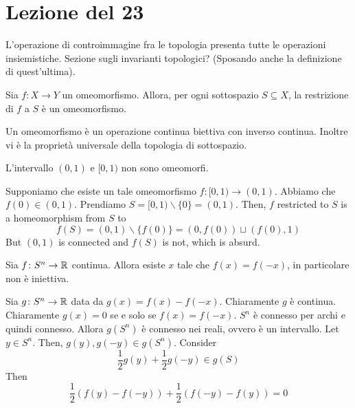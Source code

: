 \documentclass[a4paper]{article}
\begin{document}
\pagebreak

\section{Lezione del 23}

L'operazione di controimmagine fra le topologia presenta tutte le operazioni insiemistiche.
Sezione sugli invarianti topologici? (Sposando anche la definizione di quest'ultima).

\begin{snippetlemma}{}
    Sia \(f \colon X \to Y\) un omeomorfismo.
    Allora, per ogni sottospazio \(S \subseteq X\),
    la restrizione di \(f\) a \(S\) è un omeomorfismo.
\end{snippetlemma}

\begin{snippetproof}{}
    Un omeomorfismo è un operazione continua biettiva con inverso continua.
    Inoltre vi è la proprietà universale della topologia di sottospazio.
\end{snippetproof}

\begin{snippetexample}{}
    L'intervallo \((0,1)\) e \([0,1)\) non sono omeomorfi.
\end{snippetexample}

\begin{snippetproof}{}
    Supponiamo che esiste un tale omeomorfismo \(f \colon [0,1) \to (0,1)\).
    Abbiamo che \(f(0) \in (0,1)\).
    Prendiamo \(S = [0,1) \backslash \{0\} = (0,1)\).
    Then, \(f\) restricted to \(S\) is a homeomorphism
    from \(S\) to \[
        f(S) = (0,1) \backslash \{f(0)\} = (0, f(0)) \sqcup (f(0), 1)
    \]
    But \((0,1)\) is connected and \(f(S)\) is not, which is absurd.
\end{snippetproof}

\begin{snippetexample}{}
    Sia \(f \colon S^n \to \mathbb{R}\) continua.
    Allora esiste \(x\) tale che \(f(x) = f(-x)\), in particolare non è iniettiva.
\end{snippetexample}

\begin{snippetproof}{}
    Sia \(g \colon S^n \to \mathbb{R}\) data da \(g(x) = f(x) - f(-x)\).
    Chiaramente \(g\) è continua. Chiaramente \(g(x) = 0\)
    se e solo se \(f(x) = f(-x)\).
    \(S^n\) è connesso per archi e quindi connesso.
    Allora \(g(S^n)\) è connesso nei reali, ovvero è un intervallo.
    Let \(y \in S^n\).
    Then, \(g(y), g(-y) \in g(S^n)\). Consider
    \[
        \frac{1}{2}g(y) + \frac{1}{2}g(-y) \in g(S)
    \]
    Then
    \[
        \frac{1}{2}\left(
            f(y) - f(-y)
        \right) + \frac{1}{2}\left(
            f(-y) - f(y)
        \right) = 0
    \]
\end{snippetproof}
\end{document}
